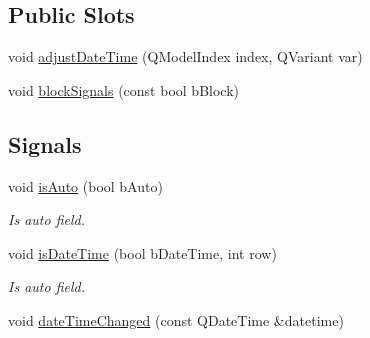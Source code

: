 \subsection*{Public Slots}
\begin{DoxyCompactItemize}
\item 
void \hyperlink{class_custom_time_ctrl_ab385f1fff588560878db14f4ed1516cb}{adjustDateTime} (QModelIndex index, QVariant var)
\item 
void \hyperlink{class_custom_time_ctrl_a1d10c2064ea9b367f5d6456cc30d759f}{blockSignals} (const bool bBlock)
\end{DoxyCompactItemize}
\subsection*{Signals}
\begin{DoxyCompactItemize}
\item 
void \hyperlink{class_custom_time_ctrl_aadc7a3337d1964c143c5d9da7bbc8f25}{isAuto} (bool bAuto)
\begin{DoxyCompactList}\small\item\em Is auto field. \item\end{DoxyCompactList}\item 
void \hyperlink{class_custom_time_ctrl_a7d9d68dbb0ad314e8e9e403b71398ac6}{isDateTime} (bool bDateTime, int row)
\begin{DoxyCompactList}\small\item\em Is auto field. \item\end{DoxyCompactList}\item 
void \hyperlink{class_custom_time_ctrl_a9552c85972ed7c3f0c3c61bc507e0931}{dateTimeChanged} (const QDateTime \&datetime)
\end{DoxyCompactItemize}
